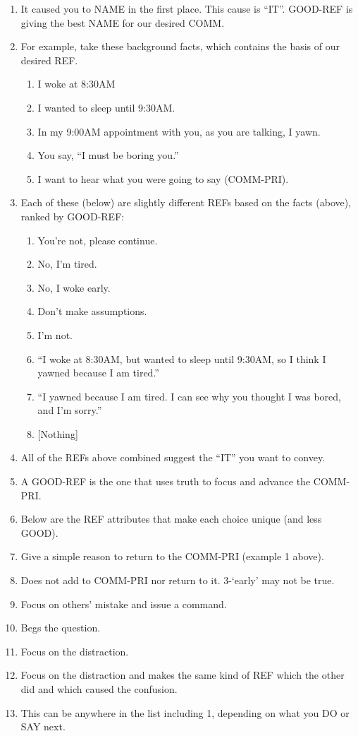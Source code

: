 \documentclass[
]{book}
\providecommand{\tightlist}{%
  \setlength{\itemsep}{0pt}\setlength{\parskip}{0pt}}
\begin{document}
\begin{enumerate}
\def\labelenumi{\arabic{enumi}.}
\setcounter{enumi}{18}
\item
  It caused you to NAME in the first place. This cause is ``IT''.
  GOOD-REF is giving the best NAME for our desired COMM.
\item
  For example, take these background facts, which contains the basis
  of our desired REF.

  \begin{enumerate}
  \def\labelenumii{\arabic{enumii}.}
  \tightlist
  \item
    I woke at 8:30AM
  \item
    I wanted to sleep until 9:30AM.
  \item
    In my 9:00AM appointment with you, as you are talking, I yawn.
  \item
    You say, ``I must be boring you.''
  \item
    I want to hear what you were going to say (COMM-PRI).
  \end{enumerate}
\item
  Each of these (below) are slightly different REFs based on the facts
  (above), ranked by GOOD-REF:

  \begin{enumerate}
  \def\labelenumii{\arabic{enumii}.}
  \tightlist
  \item
    You're not, please continue.
  \item
    No, I'm tired.
  \item
    No, I woke early.
  \item
    Don't make assumptions.
  \item
    I'm not.
  \item
    ``I woke at 8:30AM, but wanted to sleep until 9:30AM, so I think
    I yawned because I am tired.''
  \item
    ``I yawned because I am tired. I can see why you thought I was
    bored, and I'm sorry.''
  \item
    {[}Nothing{]}
  \end{enumerate}
\item
  All of the REFs above combined suggest the ``IT'' you want to convey.
\item
  A GOOD-REF is the one that uses truth to focus and advance the
  COMM-PRI.
\item
  Below are the REF attributes that make each choice unique (and less
  GOOD).
\item
  Give a simple reason to return to the COMM-PRI (example 1 above).
\item
  Does not add to COMM-PRI nor return to it. 3-`early' may not be
  true.
\item
  Focus on others' mistake and issue a command.
\item
  Begs the question.
\item
  Focus on the distraction.
\item
  Focus on the distraction and makes the same kind of REF which the
  other did and which caused the confusion.
\item
  This can be anywhere in the list including 1, depending on what you
  DO or SAY next.


\end{enumerate}
\end{document}
